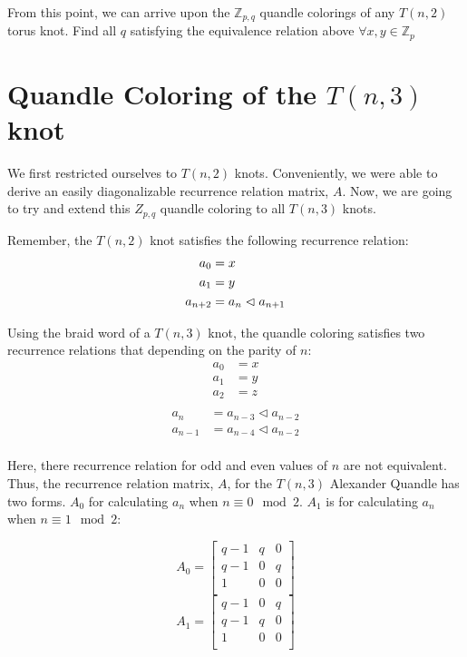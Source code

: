 \documentclass[paper.tex]{subfiles}
\begin{document}
From this point, we can arrive upon the $\mathbb{Z}_{p,q}$ quandle colorings of any $T(n,2)$ torus knot. Find all $q$ satisfying the equivalence relation above $\forall x,y \in \mathbb{Z}_p$

\section{Quandle Coloring of the $T(n,3)$ knot}\label{sec:3ntorus}
We first restricted ourselves to $T(n,2)$ knots. Conveniently, we were able to derive an easily diagonalizable recurrence relation matrix, $A$. Now, we are going to try and extend this $Z_{p,q}$ quandle coloring to all $T(n,3)$ knots.

Remember, the $T(n,2)$ knot satisfies the following recurrence relation:
\begin{align*}
	a_0 &= x \\
	a_1 &= y \\
	a_{n+2} &= a_{n} \vartriangleleft a_{n+1} \\
\end{align*}

Using the braid word of a $T(n,3)$ knot, the quandle coloring satisfies two recurrence relations that depending on the parity of $n$:
\begin{align*}
	a_0 &= x \\
	a_1 &= y \\
	a_2 &= z \\
\end{align*}
\begin{align*}
	a_{n} &= a_{n-3} \triangleleft a_{n-2} \\
	a_{n-1} &= a_{n-4} \triangleleft a_{n-2} \\
\end{align*}

Here, there recurrence relation for odd and even values of $n$ are not equivalent. Thus, the recurrence relation matrix, $A$, for the $T(n,3)$ Alexander Quandle has two forms. $A_{0}$ for calculating $a_{n}$ when $n \equiv 0 \mod 2$. $A_{1}$ is for calculating $a_{n}$ when $n \equiv 1 \mod 2$:

\[ A_{0} =
\left[ \begin{array}{ccc}
q-1 & q & 0 \\
q-1 & 0 & q \\
1 & 0 & 0 \\
\end{array} \right]
\]
\[ A_{1} =
\left[ \begin{array}{ccc}
q-1 & 0 & q \\
q-1 & q & 0 \\
1 & 0 & 0 \\
\end{array} \right]
\]
\end{document}
